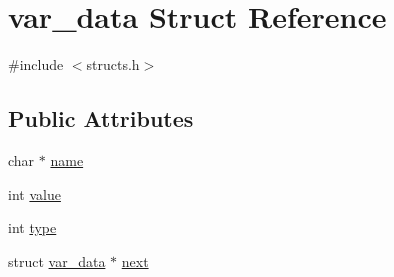 \hypertarget{structvar__data}{\section{var\-\_\-data Struct Reference}
\label{structvar__data}
}


{\ttfamily \#include $<$structs.\-h$>$}

\subsection*{Public Attributes}
\begin{DoxyCompactItemize}
\item 
char $\ast$ \hyperlink{structvar__data_a7a7b19b896fa8d73a4e51eceebd8126a}{name}
\item 
int \hyperlink{structvar__data_af02c0ccc7bc097742a52e6c0f9d602c3}{value}
\item 
int \hyperlink{structvar__data_a77da3718b382ccb4f1e2460628b0d197}{type}
\item 
struct \hyperlink{structvar__data}{var\-\_\-data} $\ast$ \hyperlink{structvar__data_a7f176b0bf237dc2dc8d6220c63f6de4c}{next}
\end{DoxyCompactItemize}


